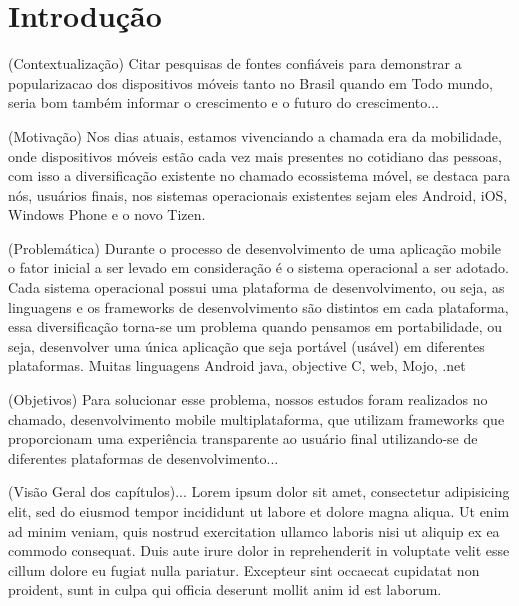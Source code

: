 \chapter{Introdução} %
(Contextualização) Citar pesquisas de fontes confiáveis para demonstrar a
popularizacao dos dispositivos móveis tanto no Brasil quando em Todo mundo,
seria bom também informar o crescimento e o futuro do crescimento...
\cite{mobile2009eco}

(Motivação) Nos dias atuais, estamos vivenciando a chamada era da mobilidade, onde dispositivos
móveis estão cada vez mais presentes no cotidiano das pessoas, com isso a
diversificação existente no chamado ecossistema móvel, se destaca para nós,
usuários finais, nos sistemas operacionais existentes sejam eles Android, iOS,
Windows Phone e o novo Tizen. \cite{adriel2012titanium}

(Problemática) Durante o processo de desenvolvimento de uma aplicação mobile o
fator inicial a ser levado em consideração é o sistema operacional a ser adotado.
Cada sistema operacional possui uma plataforma de desenvolvimento, ou seja, as
linguagens e os frameworks de desenvolvimento são distintos em cada plataforma,
essa diversificação torna-se um problema quando pensamos em portabilidade,
ou seja, desenvolver uma única aplicação que seja portável (usável) em
diferentes plataformas.
Muitas linguagens Android java, objective C, web, Mojo, .net

(Objetivos) Para solucionar esse problema, nossos estudos foram realizados no
chamado, desenvolvimento mobile multiplataforma, que utilizam frameworks que
proporcionam uma experiência transparente ao usuário final utilizando-se de
diferentes plataformas de desenvolvimento...

(Visão Geral dos capítulos)...
Lorem ipsum dolor sit amet, consectetur adipisicing elit, sed do eiusmod
tempor incididunt ut labore et dolore magna aliqua. Ut enim ad minim veniam,
quis nostrud exercitation ullamco laboris nisi ut aliquip ex ea commodo
consequat. Duis aute irure dolor in reprehenderit in voluptate velit esse
cillum dolore eu fugiat nulla pariatur. Excepteur sint occaecat cupidatat non
proident, sunt in culpa qui officia deserunt mollit anim id est laborum.


